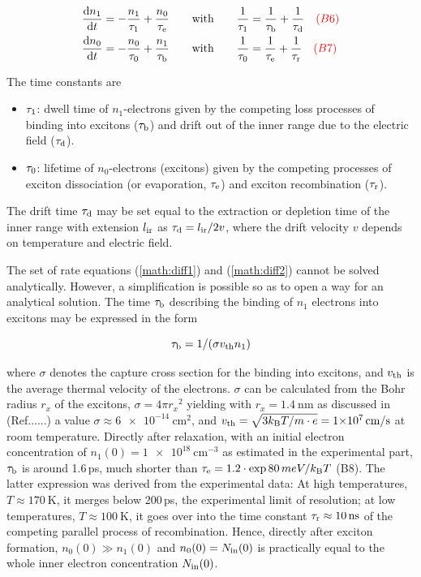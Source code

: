 \begin{align}
\label{math:diff1}
 \frac{\mathrm d n_1}{\mathrm d t} &= -\frac{n_1}{\tau_{1}}  + \frac{n_0}{\tau_\textrm{e}} \qquad \textrm{with} \qquad\frac{1}{\tau_{1}} = \frac{1}{\tau_{\textrm{b}}} + \frac{1}{\tau_{\textrm{d}}} \quad {\color{red}(B6)}\\
 \frac{\mathrm d n_0}{\mathrm d t} &= -\frac{n_0}{\tau_{0}} + \frac{n_1}{\tau_{\textrm{b}}} \qquad \textrm{with}    \qquad\frac{1}{\tau_{0}}= \frac{1}{\tau_\textrm{e}} + \frac{1}{\tau_\textrm{r}} \quad {\color{red}(B7)}
 \label{math:diff2}
\end{align}

\noindent
The time constants are

\begin{itemize}
 \item $\tau_{1}$: dwell time of $n_1$-electrons given by the competing loss processes of binding into excitons ($\tau_{\textrm{b}}$) and drift out of the inner range due to the electric field ($\tau_{\textrm{d}}$).
 \item $\tau_{0}$: lifetime of $n_0$-electrons (excitons)  given by the competing processes of exciton dissociation (or evaporation, $\tau_\textrm{e}$) and exciton recombination ($\tau_\textrm{r}$).
\end{itemize}

\noindent
The drift time $\tau_{\textrm{d}}$ may be set equal to the extraction or depletion time of the inner range with extension $l_{\textrm{ir}}$ as $\tau_{\textrm{d}}  = l_{\textrm{ir}}/2v$,
 where the drift velocity $v$ depends on temperature and electric field. 

The set of rate equations (\ref{math:diff1}) and (\ref{math:diff2}) cannot be solved analytically. 
However, a simplification is possible so as to open a way for an analytical solution. 
The time $\tau_{\textrm{b}}$ describing the binding of $n_1$ electrons into excitons  may be expressed in the form

\begin{equation}
 \tau_{\textrm{b}} = 1/(\sigma \mathnormal{v}_{\textrm{th}} n_1) 
\end{equation}

\noindent
where $\sigma$ denotes the capture cross section for the binding into excitons, and $\mathnormal{v}_{\textrm{th}}$ is the average thermal velocity of the electrons. 
$\sigma$ can be calculated from the Bohr radius $r_x$ of the excitons, $\sigma  = 4 \pi {r_x}^2$  yielding with  $r_x = \SI{1.4}{\nm}$  as discussed in (Ref......)  a value $\sigma  \approx \SI{6e-14}{\cm^2}$,
 and $\vth = \sqrt{3\kB T/m\cdot\e }= \SI{1e7}{\cm/\s}$ at room temperature. 
Directly after relaxation, with an initial electron concentration of $n_1(0) = \SI{1e18}{\cm^{-3}}$ as estimated in the experimental part, $\tau_{\textrm{b}}$ is around 1.6\,ps,
 much shorter than $\tau_\textrm{e} = 1.2 \cdot \exp{80\,meV/k_{\textrm{B}}T}$ {\color{red}(B8)}.
The latter expression was derived from the experimental data:
 At high temperatures, $T \approx \SI{170}{\kelvin}$, it merges below 200\,ps, the experimental limit of resolution;
 at low temperatures, $T \approx \SI{100}{\kelvin}$, it goes over into the time constant $\taurec \approx  \SI{10}{\ns}$ of the competing parallel process of recombination. 
Hence, directly after exciton formation, $n_0(0) \gg   n_1(0)$ and $n_0(0) = N_{\textrm{in}}(0)$ is practically equal to the whole inner electron concentration $N_{\textrm{in}}(0)$. 

